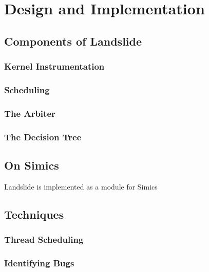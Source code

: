 \documentclass[10pt,twocolumn]{article}
\begin{document}
\section{Design and Implementation}
\subsection{Components of Landslide}

\subsubsection{Kernel Instrumentation}

\subsubsection{Scheduling}

\subsubsection{The Arbiter}

\subsubsection{The Decision Tree}

\subsection{On Simics}

Landslide is implemented as a module for Simics\cite{simics}

\subsection{Techniques}

\subsubsection{Thread Scheduling}

\subsubsection{Identifying Bugs}
\end{document}
